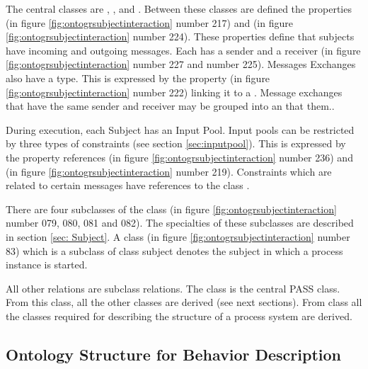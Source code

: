 The central classes are , , and . Between these classes are defined the properties  (in figure \ref{fig:ontogrsubjectinteraction} number 217) and  (in figure \ref{fig:ontogrsubjectinteraction} number 224). These properties define that subjects have incoming and outgoing messages. Each  has a sender and a receiver (in figure \ref{fig:ontogrsubjectinteraction} number 227 and number 225). Messages Exchanges also have a type. This is expressed by the property  (in figure \ref{fig:ontogrsubjectinteraction} number 222) linking it to a . Message exchanges that have the same sender and receiver may be grouped into an  that  them..

During execution, each Subject has an Input Pool. Input pools can be restricted by three types of constraints (see section \ref{sec:inputpool}). This is expressed by the property references  (in figure \ref{fig:ontogrsubjectinteraction} number 236) and  (in figure \ref{fig:ontogrsubjectinteraction} number 219). Constraints which are related to certain messages have references to the class .

There are four subclasses of the class  (in figure \ref{fig:ontogrsubjectinteraction} number 079, 080, 081 and 082). The specialties of these subclasses are described in section \ref{sec: Subject}. A class  (in figure \ref{fig:ontogrsubjectinteraction} number 83) which is a subclass of class subject denotes the subject in which a process instance is started.

All other relations are subclass relations. The class  is the central PASS class. From this class, all the other classes are derived (see next sections). From class  all the classes required for describing the structure of a process system are derived.



\subsection{Ontology Structure for Behavior Description}

